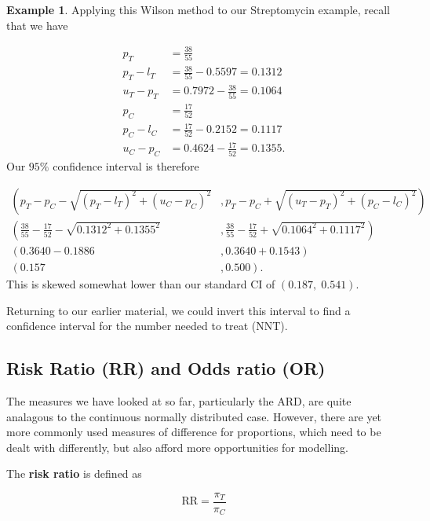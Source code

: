 \documentclass[
  openany]{book}
\theoremstyle{definition}
\theoremstyle{definition}
\newtheorem{example}{Example}[chapter]
\theoremstyle{definition}
\theoremstyle{definition}
\theoremstyle{remark}
\begin{document}
\begin{example}
Applying this Wilson method to our Streptomycin example, recall that we have

\[
\begin{aligned}
p_T & = \frac{38}{55}\\
p_T - l_T & = \frac{38}{55} - 0.5597 = 0.1312\\
u_T - p_T & = 0.7972 - \frac{38}{55} = 0.1064\\
p_C & = \frac{17}{52} \\
p_C - l_C & = \frac{17}{52}  - 0.2152 = 0.1117\\
u_C - p_C & = 0.4624 - \frac{17}{52} = 0.1355.
\end{aligned}
\]
Our \(95\%\) confidence interval is therefore

\[
\begin{aligned}
\left(p_T - p_C - \sqrt{\left(p_T-l_T\right)^2 + \left(u_C - p_C\right)^2}\right.&,\left. p_T - p_C + \sqrt{\left(u_T - p_T\right)^2 + \left(p_C - l_C\right)^2}\right)\\
\left(\frac{38}{55}-\frac{17}{52} - \sqrt{0.1312^2 + 0.1355^2}\right.&,\left.\frac{38}{55}-\frac{17}{52} + \sqrt{0.1064^2 + 0.1117^2}\right)\\
\left(0.3640 - 0.1886 \right.&,\left. 0.3640+ 0.1543\right)\\
\left(0.157 \right.&,\left.0.500\right).
\end{aligned}
\]
This is skewed somewhat lower than our standard CI of \(\left(0.187,\;0.541\right).\)
\end{example}

Returning to our earlier material, we could invert this interval to find a confidence interval for the number needed to treat (NNT).

\subsection{Risk Ratio (RR) and Odds ratio (OR)}\label{risk-ratio-rr-and-odds-ratio-or}

The measures we have looked at so far, particularly the ARD, are quite analagous to the continuous normally distributed case. However, there are yet more commonly used measures of difference for proportions, which need to be dealt with differently, but also afford more opportunities for modelling.

The \textbf{risk ratio} is defined as

\[\text{RR} = \frac{\pi_T}{\pi_C}\]
\end{document}
